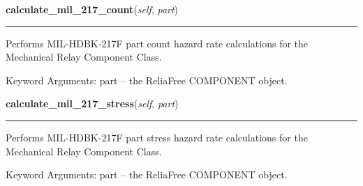     \label{reliafree:relays:relay:Mechanical:calculate_mil_217_count}

    \vspace{0.5ex}

\hspace{.8\funcindent}\begin{boxedminipage}{\funcwidth}

    \raggedright \textbf{calculate\_mil\_217\_count}(\textit{self}, \textit{part})

    \vspace{-1.5ex}

    \rule{\textwidth}{0.5\fboxrule}
\setlength{\parskip}{2ex}
    Performs MIL-HDBK-217F part count hazard rate calculations for the 
    Mechanical Relay Component Class.

    Keyword Arguments: part -- the ReliaFree COMPONENT object.

\setlength{\parskip}{1ex}
    \end{boxedminipage}

    \label{reliafree:relays:relay:Mechanical:calculate_mil_217_stress}

    \vspace{0.5ex}

\hspace{.8\funcindent}\begin{boxedminipage}{\funcwidth}

    \raggedright \textbf{calculate\_mil\_217\_stress}(\textit{self}, \textit{part})

    \vspace{-1.5ex}

    \rule{\textwidth}{0.5\fboxrule}
\setlength{\parskip}{2ex}
    Performs MIL-HDBK-217F part stress hazard rate calculations for the 
    Mechanical Relay Component Class.

    Keyword Arguments: part -- the ReliaFree COMPONENT object.

\setlength{\parskip}{1ex}
    \end{boxedminipage}

